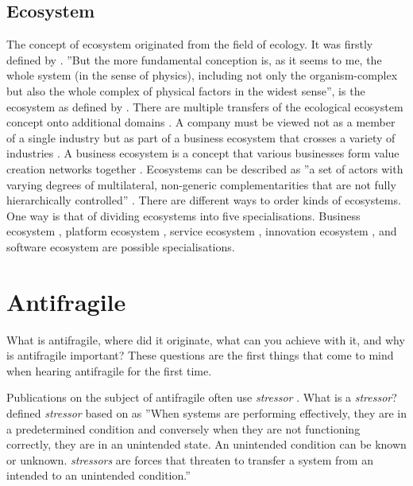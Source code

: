 \subsection{Ecosystem}
\label{sub:tbecosystem}
The concept of ecosystem originated from the field of ecology. It was firstly defined by \textcite[p.~229]{Tansley1935} \parencite[p.~19]{Rich1988}. ''But the more fundamental conception is, as it seems to me, the whole system (in the sense of physics), including not only the organism-complex but also the whole complex of physical factors in the widest sense'', is the ecosystem as defined by \textcite[p.~299]{Tansley1935}. There are multiple transfers of the ecological ecosystem concept onto additional domains \parencite[p.~3]{Guggenberger2020}. A company must be viewed not as a member of a single industry but as part of a business ecosystem that crosses a variety of industries \parencite[p.~76]{Moore1993}. A business ecosystem is a concept that various businesses form value creation networks together \parencite[p.~3]{Guggenberger2020}. Ecosystems can be described as ''a set of actors with varying degrees of multilateral, non-generic complementarities that are not fully hierarchically controlled'' \parencite[p.~2255]{Jacobides2018}. There are different ways to order kinds of ecosystems. One way is that of dividing ecosystems into five specialisations. Business ecosystem \parencite[p.~76]{Moore1993}, platform ecosystem \parencite[p.~5]{Guggenberger2020}, service ecosystem \parencites{Barros2006}{Papazoglou2006}{Huang2014}, innovation ecosystem \parencites{Iansiti2004}{Carayannis2009}{Gomes2018}, and software ecosystem \parencites{Manikas2013}[p.~5]{Guggenberger2020} are possible \glspl{specialisation}.

\section{Antifragile}
\label{sec:tbantifragile}
What is \gls{antifragile}, where did it originate, what can you achieve with it, and why is \gls{antifragile} important? These questions are the first things that come to mind when hearing \gls{antifragile} for the first time.

Publications on the subject of \gls{antifragile} often use \textit{\gls{stressor}} \parencite[p.~32]{Botjes2020}. What is a \textit{\gls{stressor}}? \textcite[p.~23]{Ghasemi2017} defined \textit{\gls{stressor}} based on \textcites{TurnerII2003}{Chrousos2009} as ''When systems are performing effectively, they are in a predetermined condition and conversely when they are not functioning correctly, they are in an unintended state. An unintended condition can be known or unknown. \textit{\Glspl{stressor}} are forces that threaten to transfer a system from an intended to an unintended condition.''

